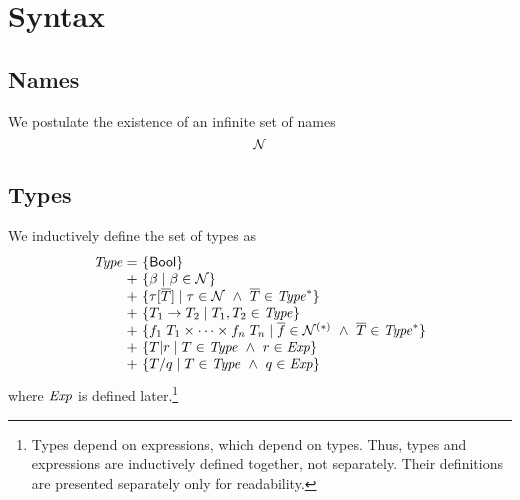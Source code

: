 \section{Syntax}
\label{syntax}

\subsection{Names}

We postulate the existence of an infinite set of names
\[
\mathcal{N}
\]


\subsection{Types}

We inductively define the set of types as
\[
\setdefVII
 {\Typ}
 {+}
 {\setI{\bool}}
 {\setST{\tvar}{\tvar\in\Nam}}
 {\setST{\tinstO}{\tnam\in\Nam\AND\typS\in\Seq{\Typ}}}
 {\setST{\tarr{\typ_1}{\typ_2}}{\typ_1,\typ_2\in\Typ}}
 {\setST{\trecFTO}{\fnamS\in\SeqNR{\Nam}\AND\typS\in\Seq{\Typ}}}
 {\setST{\tsubO}{\typ\in\Typ\AND\tspred\in\Expr}}
 {\setST{\tquotO}{\typ\in\Typ\AND\tqpred\in\Expr}}
\]
where $\mathit{Exp}$ is defined later.\footnote{Types depend on expressions, which
depend on types. Thus, types and expressions are inductively defined together,
not separately. Their definitions are presented separately only for
readability.}

